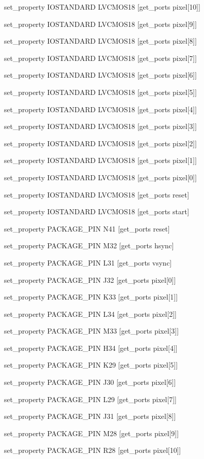 set\_property IOSTANDARD LVCMOS18 [get\_ports {pixel[10]}]

set\_property IOSTANDARD LVCMOS18 [get\_ports {pixel[9]}]

set\_property IOSTANDARD LVCMOS18 [get\_ports {pixel[8]}]

set\_property IOSTANDARD LVCMOS18 [get\_ports {pixel[7]}]

set\_property IOSTANDARD LVCMOS18 [get\_ports {pixel[6]}]

set\_property IOSTANDARD LVCMOS18 [get\_ports {pixel[5]}]

set\_property IOSTANDARD LVCMOS18 [get\_ports {pixel[4]}]

set\_property IOSTANDARD LVCMOS18 [get\_ports {pixel[3]}]

set\_property IOSTANDARD LVCMOS18 [get\_ports {pixel[2]}]

set\_property IOSTANDARD LVCMOS18 [get\_ports {pixel[1]}]

set\_property IOSTANDARD LVCMOS18 [get\_ports {pixel[0]}]

set\_property IOSTANDARD LVCMOS18 [get\_ports reset]

set\_property IOSTANDARD LVCMOS18 [get\_ports start]

set\_property PACKAGE\_PIN N41 [get\_ports reset]

set\_property PACKAGE\_PIN M32 [get\_ports hsync]

set\_property PACKAGE\_PIN L31 [get\_ports vsync]

set\_property PACKAGE\_PIN J32 [get\_ports {pixel[0]}]

set\_property PACKAGE\_PIN K33 [get\_ports {pixel[1]}]

set\_property PACKAGE\_PIN L34 [get\_ports {pixel[2]}]

set\_property PACKAGE\_PIN M33 [get\_ports {pixel[3]}]

set\_property PACKAGE\_PIN H34 [get\_ports {pixel[4]}]

set\_property PACKAGE\_PIN K29 [get\_ports {pixel[5]}]

set\_property PACKAGE\_PIN J30 [get\_ports {pixel[6]}]

set\_property PACKAGE\_PIN L29 [get\_ports {pixel[7]}]

set\_property PACKAGE\_PIN J31 [get\_ports {pixel[8]}]

set\_property PACKAGE\_PIN M28 [get\_ports {pixel[9]}]

set\_property PACKAGE\_PIN R28 [get\_ports {pixel[10]}]

